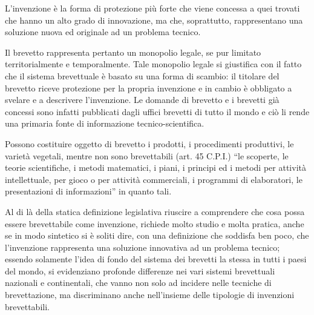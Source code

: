 L'invenzione è la forma di protezione più forte che viene concessa a quei trovati che hanno un alto grado di innovazione, ma che, soprattutto, rappresentano una soluzione nuova ed originale ad un problema tecnico.

Il brevetto rappresenta pertanto un monopolio legale, se pur limitato territorialmente e temporalmente. Tale monopolio legale si giustifica con il fatto che il sistema brevettuale è basato su una forma di scambio: il titolare del brevetto riceve protezione per la propria invenzione e in cambio è obbligato a svelare e a descrivere l'invenzione. Le domande di brevetto e i brevetti già concessi sono infatti pubblicati dagli uffici brevetti di tutto il mondo e ciò li rende una primaria fonte di informazione tecnico-scientifica.

Possono costituire oggetto di brevetto i prodotti, i procedimenti produttivi, le varietà vegetali, mentre non sono brevettabili (art. 45 C.P.I.) ``le scoperte, le teorie scientifiche, i metodi matematici, i piani, i principi ed i metodi per attività intellettuale, per gioco o per attività commerciali, i programmi di elaboratori, le presentazioni di informazioni'' in quanto tali.

Al di là della statica definizione legislativa riuscire a comprendere che cosa possa essere brevettabile come invenzione, richiede molto studio e molta pratica, anche se in modo sintetico si è soliti dire, con una definizione che soddisfa ben poco, che l'invenzione rappresenta una soluzione innovativa ad un problema tecnico; essendo solamente l'idea di fondo del sistema dei brevetti la stessa in tutti i paesi del mondo, si evidenziano profonde differenze nei vari sistemi brevettuali nazionali e continentali, che vanno non solo ad incidere nelle tecniche di brevettazione, ma discriminano anche nell'insieme delle tipologie di invenzioni brevettabili.

